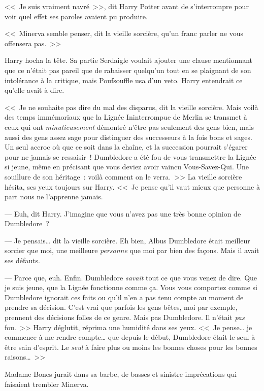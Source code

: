 <<~Je suis vraiment navré~>>, dit Harry Potter avant de s'interrompre pour voir quel effet ses paroles avaient pu produire.

<<~Minerva semble penser, dit la vieille sorcière, qu'un franc parler ne vous offensera pas.~>>

Harry hocha la tête. Sa partie Serdaigle voulait ajouter une clause mentionnant que ce n'était pas pareil que de rabaisser quelqu'un tout en se plaignant de son intolérance à la critique, mais Poufsouffle usa d'un veto. Harry entendrait ce qu'elle avait à dire.

<<~Je ne souhaite pas dire du mal des disparus, dit la vieille sorcière. Mais voilà des temps immémoriaux que la Lignée Ininterrompue de Merlin se transmet à ceux qui ont \emph{minutieusement} démontré n'être pas seulement des gens bien, mais aussi des gens assez sage pour distinguer des successeurs à la fois bons et sages. Un seul accroc où que ce soit dans la chaîne, et la succession pourrait s'égarer pour ne jamais se ressaisir~! Dumbledore a été fou de vous transmettre la Lignée si jeune, même en précisant que vous deviez avoir vaincu Vous-Savez-Qui. Une souillure de son héritage~: voilà comment on le verra.~>> La vieille sorcière hésita, ses yeux toujours sur Harry. <<~Je pense qu'il vaut mieux que personne à part nous ne l'apprenne jamais.

--- Euh, dit Harry. J'imagine que vous n'avez pas une très bonne opinion de Dumbledore~?

--- Je pensais… dit la vieille sorcière. Eh bien, Albus Dumbledore était meilleur sorcier que moi, une meilleure \emph{personne} que moi par bien des façons. Mais il avait ses défauts.

--- Parce que, euh. Enfin. Dumbledore \emph{savait} tout ce que vous venez de dire. Que je suis jeune, que la Lignée fonctionne comme ça. Vous vous comportez comme si Dumbledore ignorait ces faits ou qu'il n'en a pas tenu compte au moment de prendre sa décision. C'est vrai que parfois les gens bêtes, moi par exemple, prennent des décisions folles de ce genre. Mais pas Dumbledore. Il n'était \emph{pas} fou.~>> Harry déglutit, réprima une humidité dans ses yeux. <<~Je pense… je commence à me rendre compte… que depuis le début, Dumbledore était le seul à être sain d'esprit. Le \emph{seul} à faire plus ou moins les bonnes choses pour les bonnes raisons…~>>

Madame Bones jurait dans sa barbe, de basses et sinistre imprécations qui faisaient trembler Minerva.


